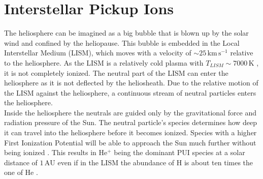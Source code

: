 \section{Interstellar Pickup Ions}
The heliosphere can be imagined as a big bubble that is blown up by the solar wind and confined by the heliopause. This bubble is embedded in the Local Interstellar Medium (LISM), which moves with a velocity of $\sim 25\,\mathrm{km\,s^{-1}}$ relative to the heliosphere. As the LISM is a relatively cold plasma with $T_{LISM} \sim 7000\,\mathrm{K}$ \citep{frisch}, it is not completely ionized. The neutral part of the LISM can enter the heliosphere as it is not deflected by the heliosheath. Due to the relative motion of the LISM against the heliosphere, a continuous stream of neutral particles enters the heliosphere.\\
Inside the heliosphere the neutrals are guided only by the gravitational force and radiation pressure of the Sun. The neutral particle's species determines how deep it can travel into the heliosphere before it becomes ionized. Species with a higher First Ionization Potential will be able to approach the Sun much further without being ionized \citep{kallenbach_2000}. This results in $\mathrm{He^{+}}$ being the dominant PUI species at a solar distance of $1\,\mathrm{AU}$ even if in the LISM the abundance of $\mathrm{H}$ is about ten times the one of $\mathrm{He}$ \citep{frisch}.
